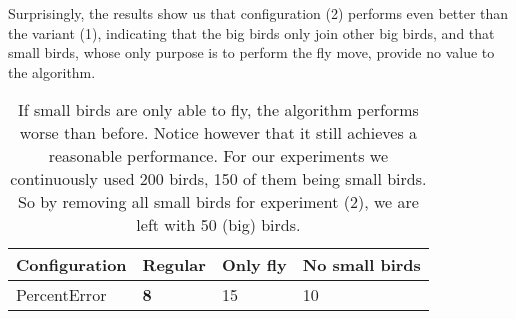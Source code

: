 Surprisingly, the results show us that configuration (2) performs even better
than the variant (1), indicating that the big birds only
join other big birds, and that small birds, whose only purpose is to perform the fly move,
provide no value to the algorithm.

\begin{table}[h!]
\centering
\begin{tabular}{ |p{1.5cm}||p{1.2cm}|p{1.2cm}|p{2cm}| }
 \hline
 Configuration& \textbf{Regular} & Only fly& No small birds\\
 \hline \hline
PercentError & \textbf{8} & 15 & 10\\
\hline
\end{tabular}
\caption{If small birds are only able to fly, the algorithm performs worse than before.
Notice however that it still achieves a reasonable performance.
For our experiments we continuously used 200 birds, 150 of them being small birds.
So by removing all small birds for experiment (2), we are left with 50 (big) birds.}
\label{small_birds_only_fly}
\end{table}
